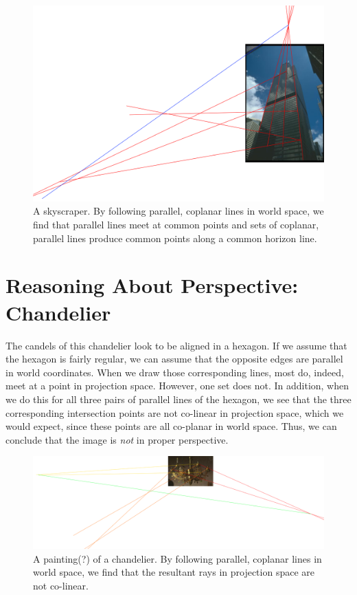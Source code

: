 \documentclass{article}
\begin{document}
\begin{figure}[!ht]
	\centering
	\includegraphics[width=160mm]{figs/building_lines.png}
	\caption{A skyscraper. By following parallel, coplanar 
        lines in world space, we find that parallel lines meet at common points 
        and sets of coplanar, parallel lines produce common points along a 
        common horizon line.}
\end{figure}

\section{Reasoning About Perspective: Chandelier}

The candels of this chandelier look to be aligned in a hexagon. If we assume 
that the hexagon is fairly regular, we can assume that the opposite edges are 
parallel in world coordinates. When we draw those corresponding lines, most do, 
indeed, meet at a point in projection space. However, one set does not. In 
addition, when we do this for all three pairs of parallel 
lines of the hexagon, we see that the three corresponding intersection points 
are not co-linear in projection space, which we would expect, since these points 
are all co-planar in world space. 
Thus, we can conclude that the image is \textit{not} in proper perspective.

\begin{figure}[!ht]
	\centering
	\includegraphics[width=160mm]{figs/chandelier_lines.png}
	\caption{A painting(?) of a chandelier. By following parallel, coplanar 
        lines in world space, we find that the resultant rays in projection 
        space are not co-linear.}
\end{figure}
\end{document}
